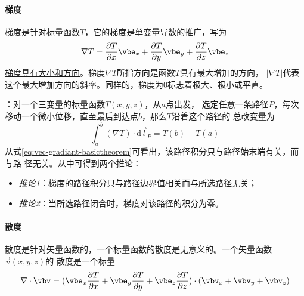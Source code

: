 \paragraph*{梯度}
梯度是针对标量函数$T$，它的梯度是单变量导数的推广，写为
\begin{equation}
    \nabla T =   \frac{\partial T}{\partial x}\vbe_x 
               + \frac{\partial T}{\partial y}\vbe_y
               + \frac{\partial T}{\partial z}\vbe_z
    \label{eq:vec-gradient}
\end{equation}
\uline{梯度具有大小和方向}。梯度$\nabla T$所指方向是函数$T$具有最大增加的方向，
$|\nabla T|$代表这个最大增加方向的斜率。同样的，梯度为$0$标志着极大、极小或平直。

：对一个三变量的标量函数$T(x, y, z)$，从$a$点出发，
选定任意一条路径$P$，每次移动一个微小位移，直至最后到达点$b$，那么$T$沿着这个路径的
总改变量为
\begin{equation}
    \int_{a}^{b} (\nabla T) \cdot \mathrm{d} \vec{l}_{P} = T(b) - T(a)
    \label{eq:vec-gradiant-basictheorem}
\end{equation}
从式\eqref{eq:vec-gradiant-basictheorem}可看出，该路径积分只与路径始末端有关，而与路
径无关。从中可得到两个推论：
\begin{itemize}
    \item \textit{推论1}：梯度的路径积分只与路径边界值相关而与所选路径无关；
    \item \textit{推论2}：当所选路径闭合时，梯度对该路径的积分为零。
\end{itemize}

\paragraph*{散度}
散度是针对矢量函数的，一个标量函数的散度是无意义的。一个矢量函数$\vec{v}(x, y, z)$的
散度是一个标量
\begin{equation}
    \nabla \cdot \vbv = (   \vbe_x \frac{\partial T}{\partial x} 
                             + \vbe_y \frac{\partial T}{\partial y}
                             + \vbe_z \frac{\partial T}{\partial z})
                           \cdot
                           (\vbv_x + \vbv_y + \vbv_z)
    \label{eq:vec-devergence}
\end{equation}


